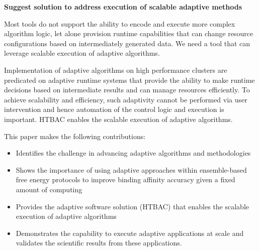  



\textbf{Suggest solution to address execution of scalable adaptive methods}

Most tools do not support the ability to encode and execute more complex 
algorithm logic, let alone provision runtime capabilities that can change 
resource configurations based on intermediately generated data.  
We need a tool that can leverage scalable execution of adaptive algorithms.

Implementation of adaptive algorithms on high performance clusters are 
predicated on adaptive runtime systems that provide the ability to make 
runtime decisions based on intermediate results and can manage resources 
efficiently. To achieve scalability and efficiency, such adaptivity cannot be 
performed via user intervention and hence automation of the control logic and 
execution is important. HTBAC enables the scalable execution of adaptive 
algorithms. 




This paper makes the following contributions:
\begin{itemize}
  \item Identifies the challenge in advancing adaptive algorithms and 
  methodologies
  \item Shows the importance of using adaptive approaches within ensemble-based
  free energy protocols to improve binding affinity accuracy given a fixed 
  amount of computing
  \item Provides the adaptive software solution (HTBAC) that enables the 
  scalable execution of adaptive algorithms
  \item Demonstrates the capability to execute adaptive applications at scale 
  and validates the scientific results from these applications.
\end{itemize}

